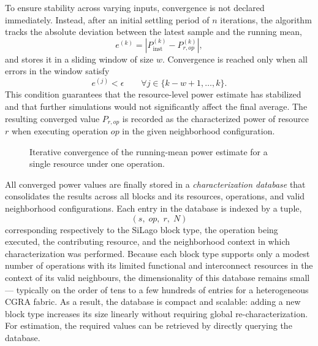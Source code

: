 To ensure stability across varying inputs, convergence is not declared immediately.
 Instead, after an initial settling period of $n$ iterations, the algorithm tracks the absolute deviation between the latest sample and the running mean,
\begin{equation}
    e^{(k)} = \left|P_{\mathrm{inst}}^{(k)} - P_{r,op}^{(k)}\right|,
\end{equation}
and stores it in a sliding window of size $w$.
Convergence is reached only when all errors in the window satisfy
\begin{equation}
    e^{(j)} < \epsilon
    \qquad
    \forall j \in \{k-w+1, \ldots, k\}.
\end{equation}
This condition guarantees that the resource-level power estimate has stabilized and that further simulations would not significantly affect the final average. The resulting converged value $P_{r,op}$ is recorded as the characterized power of resource $r$ when executing operation $op$ in the given neighborhood configuration.
\begin{figure}[t]
    \centering
    \scriptsize

\caption{\small Iterative convergence of the running-mean power estimate for a single resource under one operation.}
\label{fig:convergence}
\end{figure}

All converged power values are finally stored in a \textit{characterization database} that consolidates the results across all blocks and its resources, operations, and valid neighborhood configurations. 
Each entry in the database is indexed by a tuple,
\[
(s,\; op,\; r,\; N)
\]
corresponding respectively to the SiLago block type, the operation being executed, the contributing resource, and the neighborhood context in which characterization was performed. 
Because each block type supports only a modest number of operations with its limited functional and interconnect resources in the context of its valid neighbours, the dimensionality of this database remains small — typically on the order of tens to a few hundreds of entries for a heterogeneous CGRA fabric. 
As a result, the database is compact and scalable: adding a new block type increases its size linearly without requiring global re-characterization. 
For estimation, the required values can be retrieved by directly querying the database. 
